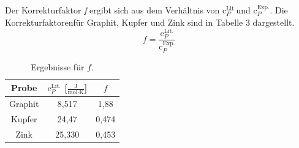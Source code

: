 \documentclass[12pt,a4paper,titlepage,headinclude,bibtotoc]{scrartcl}
\begin{document}
Der Korrekturfaktor \textit{f} ergibt sich aus dem Verhältnis von $\text{c}_P^{\text{Lit.}}$und $\text{c}_P^{\text{Exp.}}$. Die Korrekturfaktorenfür Graphit, Kupfer und Zink sind in Tabelle 3 dargestellt. 
\begin{equation}
f=\frac{\text{c}_P^{\text{Lit.}}}{\text{c}_P^{\text{Exp.}}}
\end{equation}
\begin{table}[h!]
\centering
\caption{Ergebnisse für $f$.}
\begin{tabular}{c|c|c}
Probe&$\text{c}_P^{\text{Lit.}}$ [$\frac{\text{J}}{\text{mol}\cdot\text{K}}$]&$f$\\
\hline
Graphit &8,517 &1,88 \\
\hline
Kupfer& 24,47&0,474  \\
\hline
Zink & 25,330&0,453\\
\end{tabular}
\end{table}
\FloatBarrier
\end{document}
